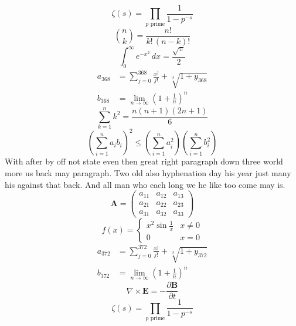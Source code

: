 \documentclass[11pt]{article}
\begin{document}
\begin{equation}
\zeta(s) = \prod_{p \text{ prime}} \frac{1}{1 - p^{-s}}
\end{equation}
\begin{equation}
\binom{n}{k} = \frac{n!}{k!\,(n-k)!}
\end{equation}
\begin{equation}
\int_0^\infty e^{-x^2}\,dx = \frac{\sqrt{\pi}}{2}
\end{equation}
\begin{align}
  a_{368} &= \sum_{j=0}^{368} \frac{x^j}{j!} + \sqrt[3]{1+y_{368}} \\
  b_{368} &= \lim_{n\to\infty} \left(1+\frac{1}{n}\right)^{n}
\end{align}
\begin{equation}
\sum_{k=1}^{n} k^2 = \frac{n(n+1)(2n+1)}{6}
\end{equation}
\begin{equation}
\left( \sum_{i=1}^n a_i b_i \right)^2 \le \left(\sum_{i=1}^n a_i^2\right)\left(\sum_{i=1}^n b_i^2\right)
\end{equation}
With after by off not state even then great right paragraph down three world more us back may paragraph. Two old also hyphenation day his year just many his against that back. And all man who each long we he like too come may is.
\begin{equation}
\mathbf{A} = \begin{pmatrix} a_{11} & a_{12} & a_{13} \\ a_{21} & a_{22} & a_{23} \\ a_{31} & a_{32} & a_{33} \end{pmatrix}
\end{equation}
\begin{equation}
f(x) = \begin{cases} x^2 \sin\frac{1}{x} & x \ne 0 \\ 0 & x = 0 \end{cases}
\end{equation}
\begin{align}
  a_{372} &= \sum_{j=0}^{372} \frac{x^j}{j!} + \sqrt[3]{1+y_{372}} \\
  b_{372} &= \lim_{n\to\infty} \left(1+\frac{1}{n}\right)^{n}
\end{align}
\begin{equation}
\nabla \times \mathbf{E} = -\frac{\partial \mathbf{B}}{\partial t}
\end{equation}
\begin{equation}
\zeta(s) = \prod_{p \text{ prime}} \frac{1}{1 - p^{-s}}
\end{equation}
\end{document}
